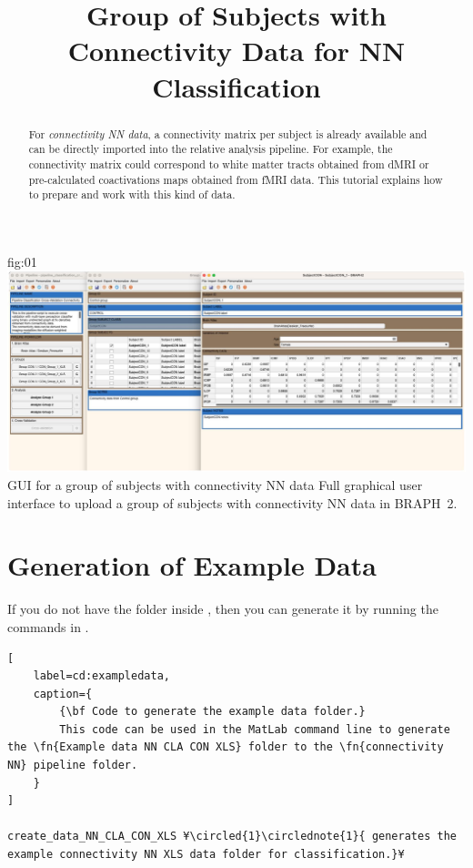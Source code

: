 \documentclass[justified]{tufte-handout}
\title{Group of Subjects with Connectivity Data for NN Classification}
\begin{document}
\maketitle

\begin{abstract}
\noindent
For \emph{connectivity NN data}, a connectivity matrix per subject is already available and can be directly imported into the relative analysis pipeline. For example, the connectivity matrix could correspond to white matter tracts obtained from dMRI or pre-calculated coactivations maps obtained from fMRI data.
This tutorial explains how to prepare and work with this kind of data.
\end{abstract}


\tableofcontents

	{fig:01}
	{\includegraphics{fig01.jpg}}
	{GUI for a group of subjects with connectivity NN data}
	{
	Full graphical user interface to upload a group of subjects with connectivity NN data in BRAPH~2. 
	}

\clearpage
\section{Generation of Example Data}

If you do not have the  folder inside , then you can generate it by running the commands in .

\begin{lstlisting}[
	label=cd:exampledata,
	caption={
		{\bf Code to generate the example data folder.}
		This code can be used in the MatLab command line to generate the \fn{Example data NN CLA CON XLS} folder to the \fn{connectivity NN} pipeline folder.
	}
]
 
create_data_NN_CLA_CON_XLS ¥\circled{1}\circlednote{1}{ generates the example connectivity NN XLS data folder for classification.}¥
\end{lstlisting}
\end{document}

